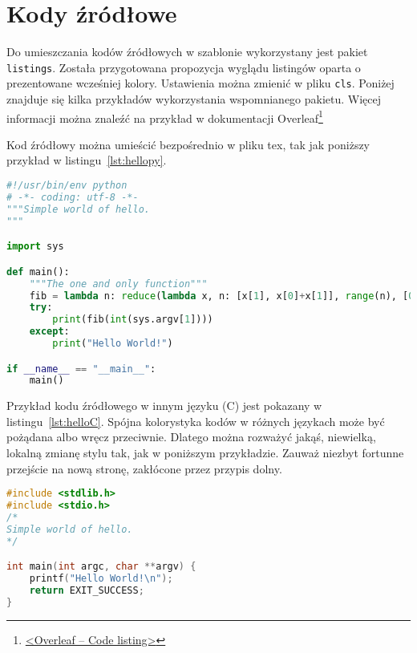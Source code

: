 
\section{Kody źródłowe}
Do umieszczania kodów źródłowych w szablonie wykorzystany jest pakiet \texttt{listings}. Została przygotowana propozycja wyglądu listingów oparta o prezentowane wcześniej kolory. Ustawienia można zmienić w pliku \texttt{cls}. Poniżej znajduje się kilka przykładów wykorzystania wspomnianego pakietu. Więcej informacji można znaleźć na przykład w dokumentacji Overleaf\footnote{\href{https://www.overleaf.com/learn/latex/code_listing}{<Overleaf -- Code listing>}}

Kod źródłowy można umieścić bezpośrednio w pliku tex, tak jak poniższy przykład w listingu~\ref{lst:hellopy}.

\begin{lstlisting}[language=Python,
    caption={Prosty program w języku Python},
    label={lst:hellopy}]
#!/usr/bin/env python
# -*- coding: utf-8 -*-
"""Simple world of hello.
"""

import sys

def main():
    """The one and only function"""
    fib = lambda n: reduce(lambda x, n: [x[1], x[0]+x[1]], range(n), [0, 1])[0]
    try:
        print(fib(int(sys.argv[1])))
    except:
        print("Hello World!")

if __name__ == "__main__":
    main()
\end{lstlisting}

Przykład kodu źródłowego w innym języku (C) jest pokazany w listingu~\ref{lst:helloC}. Spójna kolorystyka kodów w różnych językach może być pożądana albo wręcz przeciwnie. Dlatego można rozważyć jakąś, niewielką, lokalną zmianę stylu tak, jak w poniższym przykładzie. Zauważ niezbyt fortunne przejście na nową stronę, zakłócone przez przypis dolny.

\begin{lstlisting}[language=C,
    backgroundcolor=\color{EEGold!5!white},
    caption={Prosty program w języku C},
    label={lst:helloC}]
#include <stdlib.h>
#include <stdio.h>
/* 
Simple world of hello.
*/

int main(int argc, char **argv) {
	printf("Hello World!\n");
	return EXIT_SUCCESS;
}
\end{lstlisting}

